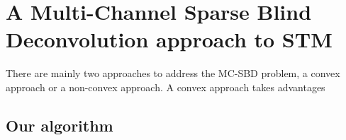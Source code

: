 \section{A Multi-Channel Sparse Blind Deconvolution approach to STM}
There are mainly two approaches to address the \ac{MC-SBD} problem, a convex approach or a non-convex approach. A convex approach takes advantages 


\subsection{Our algorithm}

